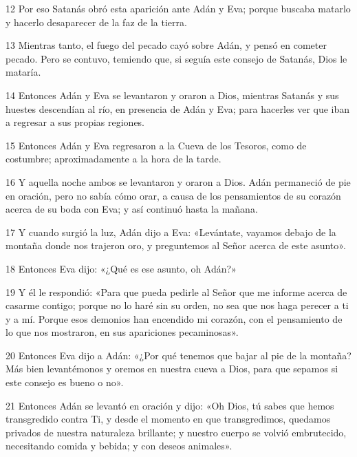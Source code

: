 \par 12 Por eso Satanás obró esta aparición ante Adán y Eva; porque buscaba matarlo y hacerlo desaparecer de la faz de la tierra.

\par 13 Mientras tanto, el fuego del pecado cayó sobre Adán, y pensó en cometer pecado. Pero se contuvo, temiendo que, si seguía este consejo de Satanás, Dios le mataría.

\par 14 Entonces Adán y Eva se levantaron y oraron a Dios, mientras Satanás y sus huestes descendían al río, en presencia de Adán y Eva; para hacerles ver que iban a regresar a sus propias regiones.

\par 15 Entonces Adán y Eva regresaron a la Cueva de los Tesoros, como de costumbre; aproximadamente a la hora de la tarde.

\par 16 Y aquella noche ambos se levantaron y oraron a Dios. Adán permaneció de pie en oración, pero no sabía cómo orar, a causa de los pensamientos de su corazón acerca de su boda con Eva; y así continuó hasta la mañana.

\par 17 Y cuando surgió la luz, Adán dijo a Eva: «Levántate, vayamos debajo de la montaña donde nos trajeron oro, y preguntemos al Señor acerca de este asunto».

\par 18 Entonces Eva dijo: «¿Qué es ese asunto, oh Adán?»

\par 19 Y él le respondió: «Para que pueda pedirle al Señor que me informe acerca de casarme contigo; porque no lo haré sin su orden, no sea que nos haga perecer a ti y a mí. Porque esos demonios han encendido mi corazón, con el pensamiento de lo que nos mostraron, en sus apariciones pecaminosas».

\par 20 Entonces Eva dijo a Adán: «¿Por qué tenemos que bajar al pie de la montaña? Más bien levantémonos y oremos en nuestra cueva a Dios, para que sepamos si este consejo es bueno o no».

\par 21 Entonces Adán se levantó en oración y dijo: «Oh Dios, tú sabes que hemos transgredido contra Ti, y desde el momento en que transgredimos, quedamos privados de nuestra naturaleza brillante; y nuestro cuerpo se volvió embrutecido, necesitando comida y bebida; y con deseos animales».

